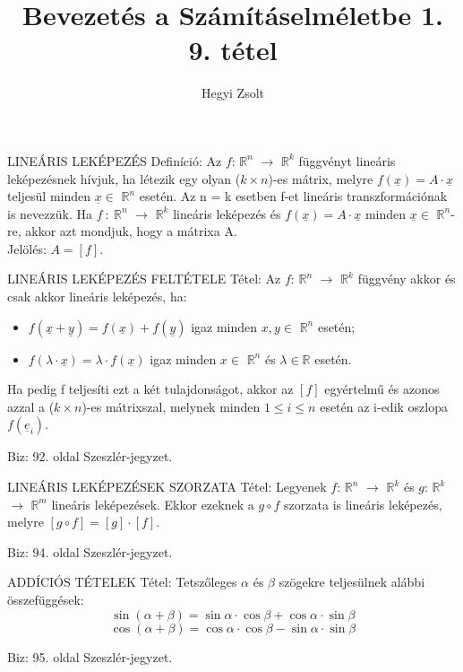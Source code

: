 \documentclass[]{article}
\title{Bevezetés a Számításelméletbe 1.\\{\large 9. tétel}}
\author{Hegyi Zsolt}
\newcommand{\R}{\mathbb{R}}
\newcommand{\Rn}[1]{$\mathbb{R}^{#1}$}
\newcommand{\Und}[1]{\underline{#1}}
\begin{document}
\maketitle{}
\begin{shaded}
LINEÁRIS LEKÉPEZÉS Definíció: Az $f$: \Rn{n} $\rightarrow$ \Rn{k} függvényt lineáris leképezésnek hívjuk, ha létezik egy olyan ($k \times n$)-es mátrix, melyre $f(\Und{x}) = A \cdot \Und{x}$ teljesül minden $\Und{x} \in$ \Rn{n} esetén. Az n = k esetben f-et lineáris transzformációnak is nevezzük. Ha $f\::\:$\Rn{n} $\rightarrow$ \Rn{k} lineáris leképezés és $f(\Und{x}) = A \cdot \Und{x}$ minden $\Und{x} \in$ \Rn{n}-re, akkor azt mondjuk, hogy a mátrixa A.\\
Jelölés: $A = [f]$.
\end{shaded}
\begin{framed}
LINEÁRIS LEKÉPEZÉS FELTÉTELE Tétel: Az $f$: \Rn{n} $\rightarrow$ \Rn{k} függvény akkor és csak akkor lineáris leképezés, ha:
\begin{itemize}
\item $f(\Und{x} + \Und{y}) = f(\Und{x}) + f(\Und{y})$ igaz minden $x,y \in$ \Rn{n} esetén;
\item $f(\lambda \cdot \Und{x}) = \lambda \cdot f(\Und{x})$ igaz minden $x \in$ \Rn{n} és $\lambda \in \R$ esetén.
\end{itemize}
Ha pedig f teljesíti ezt a két tulajdonságot, akkor az $[f]$ egyértelmű és azonos azzal a ($k \times n$)-es mátrixszal, melynek minden $1 \leq i \leq n$ esetén az i-edik oszlopa $f(\Und{e}_i)$.
\end{framed}
\begin{leftbar}
Biz: 92. oldal Szeszlér-jegyzet.
\end{leftbar}
\begin{framed}
LINEÁRIS LEKÉPEZÉSEK SZORZATA Tétel: Legyenek $f$: \Rn{n} $\rightarrow$ \Rn{k} és $g$: \Rn{k} $\rightarrow$ \Rn{m} lineáris leképezések. Ekkor ezeknek a $g \circ f$ szorzata is lineáris leképezés, melyre $[g \circ f] = [g] \cdot [f]$.
\end{framed}
\begin{leftbar}
Biz: 94. oldal Szeszlér-jegyzet.
\end{leftbar}
\begin{framed}
ADDÍCIÓS TÉTELEK Tétel: Tetszőleges $\alpha$ és $\beta$ szögekre teljesülnek alábbi összefüggések:
$$\sin(\alpha + \beta) = \sin\alpha\cdot\cos\beta + \cos\alpha\cdot\sin\beta$$
$$\cos(\alpha + \beta) = \cos\alpha\cdot\cos\beta - \sin\alpha\cdot\sin\beta$$
\end{framed}
\begin{leftbar}
Biz: 95. oldal Szeszlér-jegyzet.
\end{leftbar}
\end{document}
